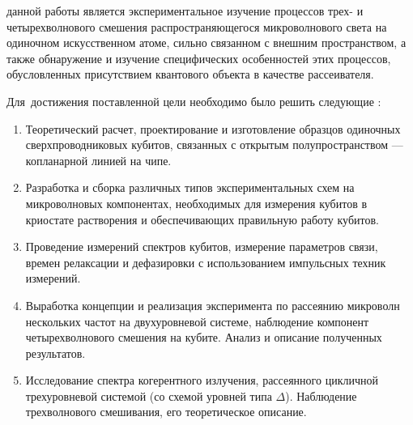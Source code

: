 
{\aim} данной работы является экспериментальное изучение процессов трех- и четырехволнового смешения распространяющегося микроволнового света на одиночном искусственном атоме, сильно связанном с внешним пространством, а также обнаружение и изучение специфических особенностей этих процессов, обусловленных присутствием квантового объекта в качестве рассеивателя.

Для~достижения поставленной цели необходимо было решить следующие {\tasks}:
\begin{enumerate}
	\item Теоретический расчет, проектирование и изготовление образцов одиночных сверхпроводниковых кубитов, связанных с открытым полупространством --- копланарной линией на чипе.
	\item Разработка и сборка различных типов экспериментальных схем на микроволновых компонентах, необходимых для измерения кубитов в криостате растворения и обеспечивающих правильную работу кубитов.
	\item Проведение измерений спектров кубитов, измерение параметров связи, времен релаксации и дефазировки с использованием импульсных техник измерений.
	\item Выработка концепции и реализация эксперимента по рассеянию микроволн нескольких частот на двухуровневой системе, наблюдение компонент четырехволнового смешения на кубите. Анализ и описание полученных результатов.
	\item Исследование спектра когерентного излучения, рассеянного цикличной трехуровневой системой (со схемой уровней типа $\Delta$). Наблюдение трехволнового смешивания, его теоретическое описание.
	
\end{enumerate}

